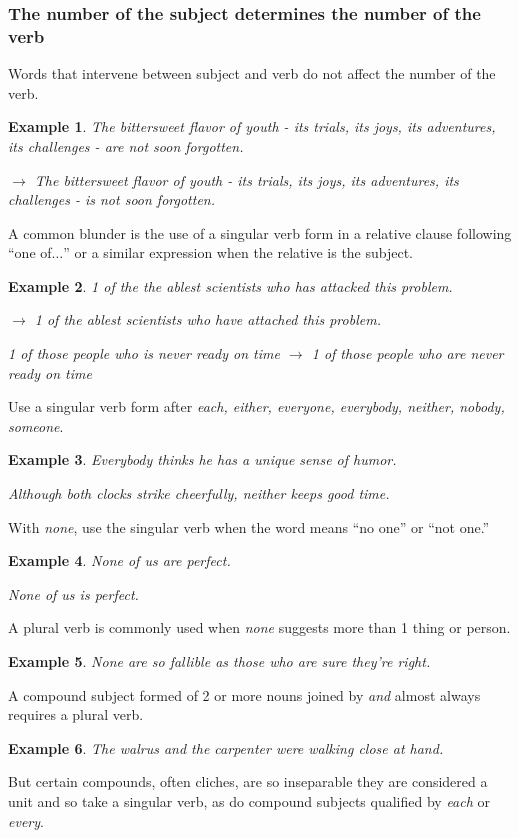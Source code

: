 \documentclass{article}
\newtheorem{example}{Example}
\begin{document}
\subsubsection{The number of the subject determines the number of the verb}
Words that intervene between subject and verb do not affect the number of the verb.
\begin{example}
	The bittersweet flavor of youth - its trials, its joys, its adventures, its challenges - are not soon forgotten.
	
	$\to$ The bittersweet flavor of youth - its trials, its joys, its adventures, its challenges - is not soon forgotten.
\end{example}
A common blunder is the use of a singular verb form in a relative clause following ``one of$\ldots$'' or a similar expression when the relative is the subject.
\begin{example}
	1 of the the ablest scientists who has attacked this problem.
	
	$\to$ 1 of the ablest scientists who have attached this problem.
	
	1 of those people who is never ready on time $\to$ 1 of those people who are never ready on time
\end{example}
Use a singular verb form after {\it each, either, everyone, everybody, neither, nobody, someone}.
\begin{example}
	Everybody thinks he has a unique sense of humor.
	
	Although both clocks strike cheerfully, neither keeps good time.
\end{example}
With {\it none}, use the singular verb when the word means ``no one'' or ``not one.''
\begin{example}
	None of us are perfect.
	
	None of us is perfect.
\end{example}
A plural verb is commonly used when {\it none} suggests more than 1 thing or person.
\begin{example}
	None are so fallible as those who are sure they're right.
\end{example}
A compound subject formed of 2 or more nouns joined by {\it and} almost always requires a plural verb.
\begin{example}
	The walrus and the carpenter were walking close at hand.
\end{example}
But certain compounds, often cliches, are so inseparable they are considered a unit and so take a singular verb, as do compound subjects qualified by {\it each} or {\it every}.
\end{document}

